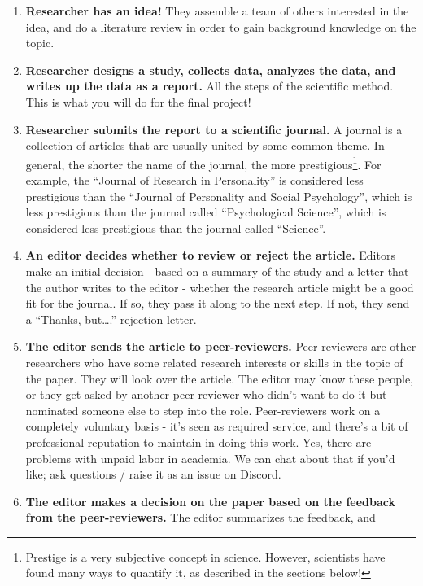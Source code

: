 \documentclass[
  letterpaper,
  DIV=11,
  numbers=noendperiod,
  oneside]{scrreprt}
\begin{document}
\begin{enumerate}
\def\labelenumi{\arabic{enumi}.}
\item
  \textbf{Researcher has an idea!} They assemble a team of others
  interested in the idea, and do a literature review in order to gain
  background knowledge on the topic.
\item
  \textbf{Researcher designs a study, collects data, analyzes the data,
  and writes up the data as a report.} All the steps of the scientific
  method. This is what you will do for the final project!
\item
  \textbf{Researcher submits the report to a scientific journal.} A
  journal is a collection of articles that are usually united by some
  common theme. In general, the shorter the name of the journal, the
  more prestigious\footnote{Prestige is a very subjective concept in
    science. However, scientists have found many ways to quantify it, as
    described in the sections below!}. For example, the ``Journal of
  Research in Personality'' is considered less prestigious than the
  ``Journal of Personality and Social Psychology'', which is less
  prestigious than the journal called ``Psychological Science'', which
  is considered less prestigious than the journal called ``Science''.~
\item
  \textbf{An editor decides whether to review or reject the article.}
  Editors make an initial decision - based on a summary of the study and
  a letter that the author writes to the editor - whether the research
  article might be a good fit for the journal. If so, they pass it along
  to the next step. If not, they send a ``Thanks, but\ldots.'' rejection
  letter.
\item
  \textbf{The editor sends the article to peer-reviewers.} Peer
  reviewers are other researchers who have some related research
  interests or skills in the topic of the paper. They will look over the
  article. The editor may know these people, or they get asked by
  another peer-reviewer who didn't want to do it but nominated someone
  else to step into the role. Peer-reviewers work on a completely
  voluntary basis - it's seen as required service, and there's a bit of
  professional reputation to maintain in doing this work. Yes, there are
  problems with unpaid labor in academia. We can chat about that if
  you'd like; ask questions / raise it as an issue on Discord.
\item
  \textbf{The editor makes a decision on the paper based on the feedback
  from the peer-reviewers.} The editor summarizes the feedback, and

\end{enumerate}
\end{document}
